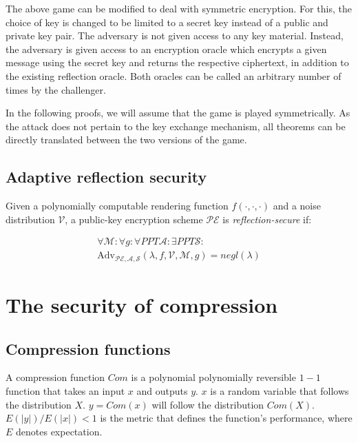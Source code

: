 \documentclass{sig-alternate-05-2015}
\begin{document}
The above game can be modified to deal with symmetric encryption. For this, the
choice of key is changed to be limited to a secret key instead of a public and
private key pair. The adversary is not given access to any key material.
Instead, the adversary is given access to an encryption oracle which encrypts a
given message using the secret key and returns the respective ciphertext, in
addition to the existing reflection oracle. Both oracles can be called an
arbitrary number of times by the challenger.

In the following proofs, we will assume that the game is played symmetrically.
As the attack does not pertain to the key exchange mechanism, all theorems can
be directly translated between the two versions of the game.

\subsection{Adaptive reflection security}\label{subsec:adaptiverefsec}

Given a polynomially computable rendering function $f(\cdot, \cdot, \cdot)$ and
a  noise distribution $\mathcal{V}$, a public-key encryption scheme
$\mathcal{PE}$ is \textit{reflection-secure} if:

\begin{align*}
\forall \mathcal{M}:
\forall g:
\forall PPT \mathcal{A}:
\exists PPT \mathcal{S}:\\
\text{Adv}_{\mathcal{PE}, \mathcal{A}, \mathcal{S}}(\lambda, f, \mathcal{V}, \mathcal{M}, g) = negl(\lambda)
\end{align*}

\section{The security of compression}\label{sec:comsec}

\subsection{Compression functions}\label{subsec:comfunc}

A compression function $Com$ is a polynomial polynomially reversible $1 - 1$
function that takes an input $x$ and outputs $y$. $x$ is a random variable that
follows the distribution $X$. $y = Com(x)$ will follow the
distribution $Com(X)$.  $E(|y|) / E(|x|) < 1$ is the metric that defines the
function's performance, where $E$ denotes expectation.
\end{document}
